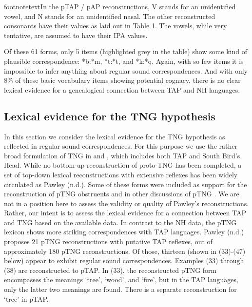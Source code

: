 footnotetext{In the pTAP / pAP reconstructions, V stands for an unidentified vowel, and N stands for an unidentified nasal. The other reconstructed consonants have their values as laid out in Table 1. The vowels, while very tentative, are assumed to have their IPA values. }%

\addtocounter{footnote}{-2}
Of these 61 forms, only 5 items (highlighted grey in the table) show some kind of plausible correspondence: *b:*m, *t:*t, and *k:*q. Again, with so few items it is impossible to infer anything about regular sound correspondences. And with only 8\% of these basic vocabulary items showing potential cognacy, there is no clear lexical evidence for a genealogical connection between TAP and NH languages.

\subsection{Lexical evidence for the TNG hypothesis}
In this section we consider the lexical evidence for the TNG hypothesis as reflected in regular sound correspondences. For this purpose we use the rather broad formulation of TNG in \citet{Pawley2005} and \citet{Ross2005}, which includes both TAP and South Bird's Head. While no bottom-up reconstruction of proto-TNG has been completed, a set of top-down lexical reconstructions with extensive reflexes has been widely circulated as Pawley (n.d.). Some of these forms were included as support for the reconstruction of pTNG obstruents \citep{Pawley2001} and in other discussions of pTNG \citep{Pawley1998,Pawley2012}. We are not in a position here to assess the validity or quality of Pawley's reconstructions. Rather, our intent is to assess the lexical evidence for a connection between TAP and TNG based on the available data. In contrast to the NH data, the pTNG lexicon shows more striking correspondences with TAP languages. Pawley (n.d.) proposes 21 pTNG reconstructions with putative TAP reflexes, out of approximately
180 pTNG reconstructions. Of those, thirteen (shown in (33)-(47) below) appear to exhibit regular sound correspondences. Examples (33) through (38) are reconstructed to pTAP. In (33), the reconstructed pTNG form encompasses the meanings `tree', `wood', and `fire', but in the TAP languages, only the latter two meanings are found. There is a separate reconstruction for `tree' in pTAP.


